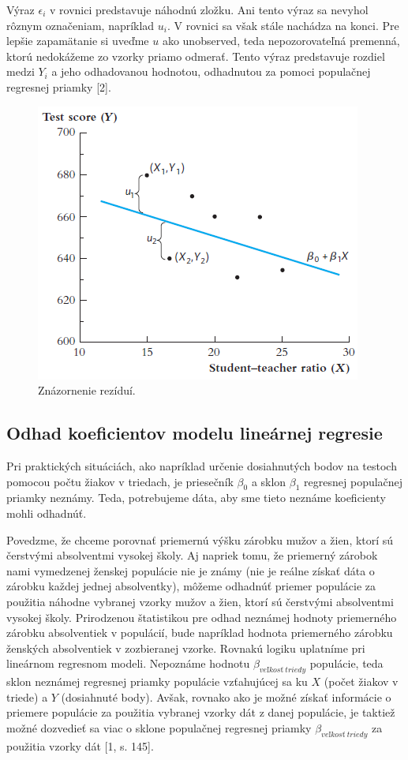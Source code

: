 \documentclass[]{tukediphc}
\begin{document}
Výraz $\epsilon_i$ v rovnici predstavuje náhodnú zložku. Ani tento výraz sa nevyhol rôznym označeniam, napríklad $u_i$. V rovnici sa však stále nachádza na konci. Pre lepšie zapamätanie si uveďme $u$ ako unobserved, teda nepozorovateľná premenná, ktorú nedokážeme zo vzorky priamo odmerať. Tento výraz predstavuje rozdiel medzi $Y_i$ a jeho odhadovanou hodnotou, odhadnutou za pomoci populačnej regresnej priamky [2].  \\


\begin{figure}
    \centering
    \includegraphics[scale=1.5]{diplomka obrazky/10.png}
    \caption{Znázornenie rezíduí.}
\end{figure}

\subsection{Odhad koeficientov modelu lineárnej regresie}

Pri praktických situáciách, ako napríklad určenie dosiahnutých bodov na testoch pomocou počtu žiakov v triedach, je priesečník $\beta_0$ a sklon $\beta_1$ regresnej populačnej priamky neznámy. Teda, potrebujeme dáta, aby sme tieto neznáme koeficienty mohli odhadnúť. 

Povedzme, že chceme porovnať priemernú výšku zárobku mužov a žien, ktorí sú čerstvými absolventmi vysokej školy. Aj napriek tomu, že priemerný zárobok nami vymedzenej ženskej populácie nie je známy (nie je reálne získať dáta o zárobku každej jednej absolventky), môžeme odhadnúť priemer populácie za použitia náhodne vybranej vzorky mužov a žien, ktorí sú čerstvými absolventmi vysokej školy. Prirodzenou štatistikou pre odhad neznámej hodnoty priemerného zárobku absolventiek v populácií, bude napríklad hodnota priemerného zárobku ženských absolventiek v zozbieranej vzorke. Rovnakú logiku uplatníme pri lineárnom regresnom modeli. Nepoznáme hodnotu $\beta_{veľkosť \ triedy}$ populácie, teda sklon neznámej regresnej priamky populácie vzťahujúcej sa ku $X$ (počet žiakov v triede) a $Y$ (dosiahnuté body). Avšak, rovnako ako je možné získať informácie o priemere populácie za použitia vybranej vzorky dát z danej populácie, je taktiež možné dozvedieť sa viac o sklone populačnej regresnej priamky $\beta_{veľkosť \ triedy}$ za použitia vzorky dát [1, s. 145]. 
\end{document}
